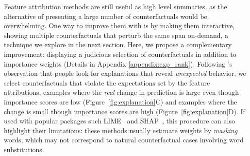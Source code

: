 Feature attribution methods are still useful as high level summaries, as the alternative of presenting a large number of counterfactuals would be overwhelming. One way to improve them with \sysname{} is by making them interactive, showing multiple counterfactuals that perturb the same span on-demand, a technique we explore in the next section. Here, we propose a complementary improvement: displaying a judicious selection of \sysname{} counterfactuals in addition to importance weights (Details in Appendix \ref{appendix:exp_rank}). 
Following \citet{miller}'s observation that people look for explanations that reveal \emph{unexpected} behavior, we select counterfactuals that violate the expectations set by the feature attributions, \ie examples where the \emph{real} change in prediction is large even though importance scores are low (Figure~\ref{fig:explanation}C) and examples where the change is small though importance scores are high (Figure~\ref{fig:explanation}D).
If used with popular packages such LIME~\cite{Ribeiro2016WhySI} and SHAP~\cite{NIPS2017_7062}, this procedure can also highlight their limitations: 
these methods usually estimate weights by \emph{masking} words, which may not correspond to natural counterfactual cases involving \eg word substitutions.









